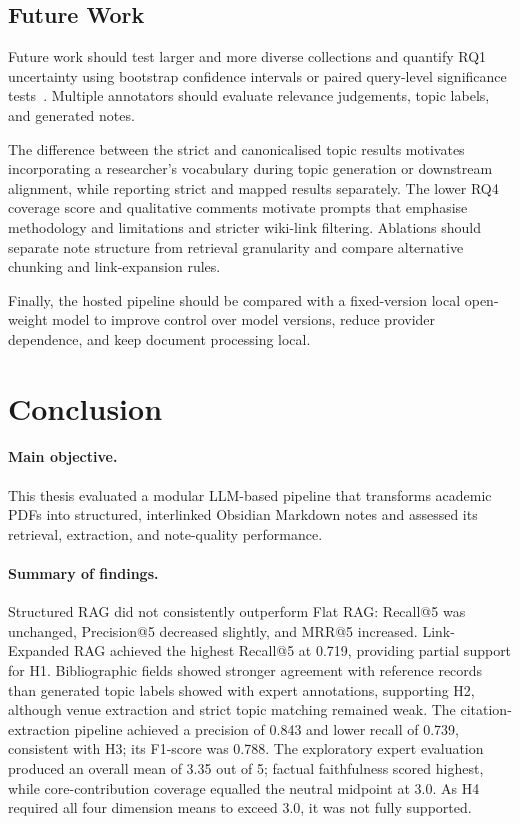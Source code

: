 \documentclass[runningheads]{llncs}
\begin{document}
\subsection{Future Work}

Future work should test larger and more diverse collections and quantify
RQ1 uncertainty using bootstrap confidence intervals or paired
query-level significance tests~\cite{urbano2019statistical}. Multiple
annotators should evaluate relevance judgements, topic labels, and
generated notes.

The difference between the strict and canonicalised topic results
motivates incorporating a researcher's vocabulary during topic
generation or downstream alignment, while reporting strict and mapped
results separately. The lower RQ4 coverage score and qualitative
comments motivate prompts that emphasise methodology and limitations
and stricter wiki-link filtering. Ablations should separate note
structure from retrieval granularity and compare alternative chunking
and link-expansion rules.

Finally, the hosted pipeline should be compared with a fixed-version
local open-weight model to improve control over model versions, reduce
provider dependence, and keep document processing local.

\section{Conclusion}
\label{sec:conclusion}

\paragraph{Main objective.}
This thesis evaluated a modular LLM-based pipeline that transforms
academic PDFs into structured, interlinked Obsidian Markdown notes and
assessed its retrieval, extraction, and note-quality performance.

\paragraph{Summary of findings.}
Structured RAG did not consistently outperform Flat RAG: Recall@5 was
unchanged, Precision@5 decreased slightly, and MRR@5 increased.
Link-Expanded RAG achieved the highest Recall@5 at 0.719, providing
partial support for H1. Bibliographic fields showed stronger agreement
with reference records than generated topic labels showed with expert
annotations, supporting H2, although venue extraction and strict topic
matching remained weak. The citation-extraction pipeline achieved a precision of 0.843 and lower
recall of 0.739, consistent with H3; its F1-score was 0.788. The exploratory expert evaluation produced an overall mean of 3.35 out
of 5; factual faithfulness scored highest, while core-contribution
coverage equalled the neutral midpoint at 3.0. As H4 required all four
dimension means to exceed 3.0, it was not fully supported.
\end{document}
